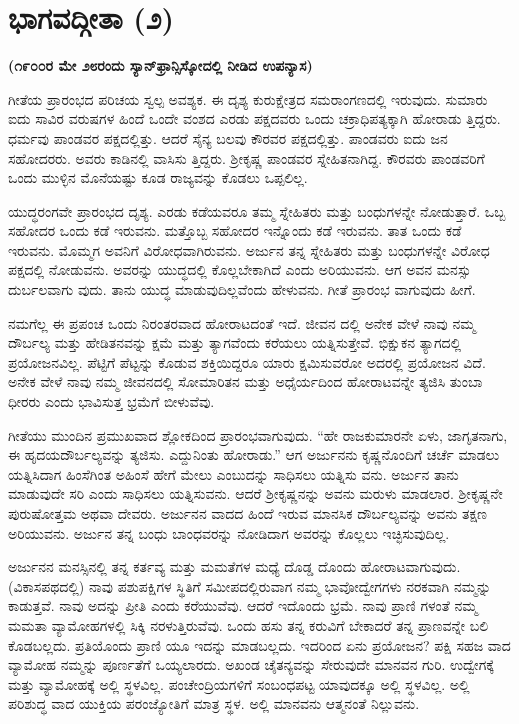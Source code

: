 
\chapter{ಭಾಗವದ್ಗೀತಾ (೨)}

\centerline{\textbf{(೧೯೦೦ರ ಮೇ ೨೮ರಂದು ಸ್ಯಾನ್​ಫ್ರಾನ್ಸಿಸ್ಕೋದಲ್ಲಿ ನೀಡಿದ ಉಪನ್ಯಾಸ)}}

ಗೀತೆಯ ಪ್ರಾರಂಭದ ಪರಿಚಯ ಸ್ವಲ್ಪ ಅವಶ್ಯಕ. ಈ ದೃಶ್ಯ ಕುರುಕ್ಷೇತ್ರದ ಸಮರಾಂಗಣದಲ್ಲಿ ಇರುವುದು. ಸುಮಾರು ಐದು ಸಾವಿರ ವರುಷಗಳ ಹಿಂದೆ ಒಂದೇ ವಂಶದ ಎರಡು ಪಕ್ಷದವರು ಒಂದು ಚಕ್ರಾಧಿಪತ್ಯಕ್ಕಾಗಿ ಹೋರಾಡು ತ್ತಿದ್ದರು. ಧರ್ಮವು ಪಾಂಡವರ ಪಕ್ಷದಲ್ಲಿತ್ತು. ಆದರೆ ಸೈನ್ಯ ಬಲವು ಕೌರವರ ಪಕ್ಷದಲ್ಲಿತ್ತು. ಪಾಂಡವರು ಐದು ಜನ ಸಹೋದರರು. ಅವರು ಕಾಡಿನಲ್ಲಿ ವಾಸಿಸು ತ್ತಿದ್ದರು. ಶ‍್ರೀಕೃಷ್ಣ ಪಾಂಡವರ ಸ್ನೇಹಿತನಾಗಿದ್ದ. ಕೌರವರು ಪಾಂಡವರಿಗೆ ಒಂದು ಮುಳ್ಳಿನ ಮೊನೆಯಷ್ಟು ಕೂಡ ರಾಜ್ಯವನ್ನು ಕೊಡಲು ಒಪ್ಪಲಿಲ್ಲ.

ಯುದ್ಧರಂಗವೇ ಪ್ರಾರಂಭದ ದೃಶ್ಯ. ಎರಡು ಕಡೆಯವರೂ ತಮ್ಮ ಸ್ನೇಹಿತರು ಮತ್ತು ಬಂಧುಗಳನ್ನೇ ನೋಡುತ್ತಾರೆ. ಒಬ್ಬ ಸಹೋದರ ಒಂದು ಕಡೆ ಇರುವನು. ಮತ್ತೊಬ್ಬ ಸಹೋದರ ಇನ್ನೊಂದು ಕಡೆ ಇರುವನು. ತಾತ ಒಂದು ಕಡೆ ಇರುವನು. ಮೊಮ್ಮಗ ಅವನಿಗೆ ವಿರೋಧವಾಗಿರುವನು. ಅರ್ಜುನ ತನ್ನ ಸ್ನೇಹಿತರು ಮತ್ತು ಬಂಧುಗಳನ್ನೇ ವಿರೋಧ ಪಕ್ಷದಲ್ಲಿ ನೋಡುವನು. ಅವರನ್ನು ಯುದ್ಧದಲ್ಲಿ ಕೊಲ್ಲಬೇಕಾಗಿದೆ ಎಂದು ಅರಿಯುವನು. ಆಗ ಅವನ ಮನಸ್ಸು ದುರ್ಬಲವಾಗು ವುದು. ತಾನು ಯುದ್ಧ ಮಾಡುವುದಿಲ್ಲವೆಂದು ಹೇಳುವನು. ಗೀತೆ ಪ್ರಾರಂಭ ವಾಗುವುದು ಹೀಗೆ.

ನಮಗೆಲ್ಲ ಈ ಪ್ರಪಂಚ ಒಂದು ನಿರಂತರವಾದ ಹೋರಾಟದಂತೆ ಇದೆ. ಜೀವನ ದಲ್ಲಿ ಅನೇಕ ವೇಳೆ ನಾವು ನಮ್ಮ ದೌರ್ಬಲ್ಯ ಮತ್ತು ಹೇಡಿತನವನ್ನು ಕ್ಷಮೆ ಮತ್ತು ತ್ಯಾಗವೆಂದು ಕರೆಯಲು ಯತ್ನಿಸುತ್ತೇವೆ. ಭಿಕ್ಷುಕನ ತ್ಯಾಗದಲ್ಲಿ ಪ್ರಯೋಜನವಿಲ್ಲ. ಪೆಟ್ಟಿಗೆ ಪೆಟ್ಟನ್ನು ಕೊಡುವ ಶಕ್ತಿಯಿದ್ದರೂ ಯಾರು ಕ್ಷಮಿಸುವರೋ ಅದರಲ್ಲಿ ಪ್ರಯೋಜನ ವಿದೆ. ಅನೇಕ ವೇಳೆ ನಾವು ನಮ್ಮ ಜೀವನದಲ್ಲಿ ಸೋಮಾರಿತನ ಮತ್ತು ಅಧೈರ್ಯದಿಂದ ಹೋರಾಟವನ್ನೇ ತ್ಯಜಿಸಿ ತುಂಬಾ ಧೀರರು ಎಂದು ಭಾವಿಸುತ್ತ ಭ್ರಮೆಗೆ ಬೀಳುವೆವು.

ಗೀತೆಯು ಮುಂದಿನ ಪ್ರಮುಖವಾದ ಶ್ಲೋಕದಿಂದ ಪ್ರಾರಂಭವಾಗುವುದು. “ಹೇ ರಾಜಕುಮಾರನೇ ಏಳು, ಜಾಗೃತನಾಗು, ಈ ಹೃದಯದೌರ್ಬಲ್ಯವನ್ನು ತ್ಯಜಿಸು. ಎದ್ದುನಿಂತು ಹೋರಾಡು.” ಆಗ ಅರ್ಜುನನು ಕೃಷ್ಣನೊಂದಿಗೆ ಚರ್ಚೆ ಮಾಡಲು ಯತ್ನಿಸಿದಾಗ ಹಿಂಸೆಗಿಂತ ಅಹಿಂಸೆ ಹೇಗೆ ಮೇಲು ಎಂಬುದನ್ನು ಸಾಧಿಸಲು ಯತ್ನಿಸು ವನು. ಅರ್ಜುನ ತಾನು ಮಾಡುವುದೇ ಸರಿ ಎಂದು ಸಾಧಿಸಲು ಯತ್ನಿಸುವನು. ಆದರೆ ಶ‍್ರೀಕೃಷ್ಣನನ್ನು ಅವನು ಮರುಳು ಮಾಡಲಾರ. ಶ‍್ರೀಕೃಷ್ಣನೇ ಪುರುಷೋತ್ತಮ ಅಥವಾ ದೇವರು. ಅರ್ಜುನನ ವಾದದ ಹಿಂದೆ ಇರುವ ಮಾನಸಿಕ ದೌರ್ಬಲ್ಯವನ್ನು ಅವನು ತಕ್ಷಣ ಅರಿಯುವನು. ಅರ್ಜುನ ತನ್ನ ಬಂಧು ಬಾಂಧವರನ್ನು ನೋಡಿದಾಗ ಅವರನ್ನು ಕೊಲ್ಲಲು ಇಚ್ಛಿಸುವುದಿಲ್ಲ.

ಅರ್ಜುನನ ಮನಸ್ಸಿನಲ್ಲಿ ತನ್ನ ಕರ್ತವ್ಯ ಮತ್ತು ಮಮತೆಗಳ ಮಧ್ಯೆ ದೊಡ್ಡ ದೊಂದು ಹೋರಾಟವಾಗುವುದು. (ವಿಕಾಸಪಥದಲ್ಲಿ) ನಾವು ಪಶುಪಕ್ಷಿಗಳ ಸ್ಥಿತಿಗೆ ಸಮೀಪದಲ್ಲಿರುವಾಗ ನಮ್ಮ ಭಾವೋದ್ವೇಗಗಳು ನರಕವಾಗಿ ನಮ್ಮನ್ನು ಕಾಡುತ್ತವೆ. ನಾವು ಅದನ್ನು ಪ್ರೀತಿ ಎಂದು ಕರೆಯುವೆವು. ಆದರೆ ಇದೊಂದು ಭ್ರಮೆ. ನಾವು ಪ್ರಾಣಿ ಗಳಂತೆ ನಮ್ಮ ಮಮತಾ ವ್ಯಾಮೋಹಗಳಲ್ಲಿ ಸಿಕ್ಕಿ ನರಳುತ್ತಿರುವೆವು. ಒಂದು ಹಸು ತನ್ನ ಕರುವಿಗೆ ಬೇಕಾದರೆ ತನ್ನ ಪ್ರಾಣವನ್ನೇ ಬಲಿ ಕೊಡಬಲ್ಲದು. ಪ್ರತಿಯೊಂದು ಪ್ರಾಣಿ ಯೂ ಇದನ್ನು ಮಾಡಬಲ್ಲದು. ಇದರಿಂದ ಏನು ಪ್ರಯೋಜನ? ಪಕ್ಷಿ ಸಹಜ ವಾದ ವ್ಯಾಮೋಹ ನಮ್ಮನ್ನು ಪೂರ್ಣತೆಗೆ ಒಯ್ಯಲಾರದು. ಅಖಂಡ ಚೈತನ್ಯವನ್ನು ಸೇರುವುದೇ ಮಾನವನ ಗುರಿ. ಉದ್ವೇಗಕ್ಕೆ ಮತ್ತು ವ್ಯಾಮೋಹಕ್ಕೆ ಅಲ್ಲಿ ಸ್ಥಳವಿಲ್ಲ. ಪಂಚೇಂದ್ರಿಯಗಳಿಗೆ ಸಂಬಂಧಪಟ್ಟ ಯಾವುದಕ್ಕೂ ಅಲ್ಲಿ ಸ್ಥಳವಿಲ್ಲ. ಅಲ್ಲಿ ಪರಿಶುದ್ಧ ವಾದ ಯುಕ್ತಿಯ ಪರಂಜ್ಯೋತಿಗೆ ಮಾತ್ರ ಸ್ಥಳ. ಅಲ್ಲಿ ಮಾನವನು ಆತ್ಮನಂತೆ ನಿಲ್ಲುವನು.

